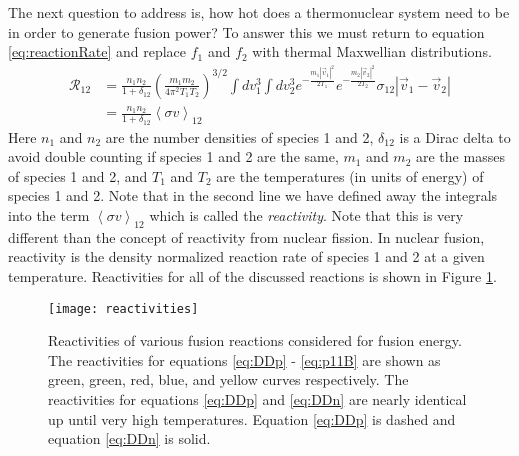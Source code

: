 	The next question to address is, how hot does a thermonuclear system need to be in order to generate fusion power? To answer this we must return to equation \ref{eq:reactionRate} and replace $f_1$ and $f_2$ with thermal Maxwellian distributions. 
	\begin{equation}
		\begin{split}
			\mathcal{R}_{12}  & = \frac{n_1n_2}{1+\delta_{12}} \left(\frac{m_1 m_2}{4\pi^2T_1T_2}\right)^{3/2} \int dv_1^3 \int dv_2^3  e^{-\frac{m_1|\vec{v}_1|^2}{2T_1}} e^{-\frac{m_2|\vec{v}_2|^2}{2T_2}} \sigma_{12} \left|\vec{v}_1 - \vec{v}_2\right| \\
			& = \frac{n_1n_2}{1+\delta_{12}} \left<\sigma v\right>_{12}
		\end{split}
		\label{eq:reactionRateThermal}
	\end{equation}
	Here $n_1$ and $n_2$ are the number densities of species 1 and 2, $\delta_{12}$ is a Dirac delta to avoid double counting if species 1 and 2 are the same, $m_1$ and $m_2$ are the masses of species 1 and 2, and $T_1$ and $T_2$ are the temperatures (in units of energy) of species 1 and 2. Note that in the second line we have defined away the integrals into the term $\left<\sigma v\right>_{12}$ which is called the \emph{reactivity}. Note that this is very different than the concept of reactivity from nuclear fission. In nuclear fusion, reactivity is the density normalized reaction rate of species 1 and 2 at a given temperature. Reactivities for all of the discussed reactions is shown in Figure \ref{fig:reactivities}.  
	
	\begin{figure}[h!]
		\centering
		\texttt{[image: reactivities]}
		\caption[Fusion Reactivities]{Reactivities of various fusion reactions considered for fusion energy. The reactivities for equations \ref{eq:DDp} - \ref{eq:p11B} are shown as green, green, red, blue, and yellow curves respectively. The reactivities for equations \ref{eq:DDp} and \ref{eq:DDn} are nearly identical up until very high temperatures. Equation \ref{eq:DDp} is dashed and equation \ref{eq:DDn} is solid.  }
		\label{fig:reactivities}
	\end{figure}
	